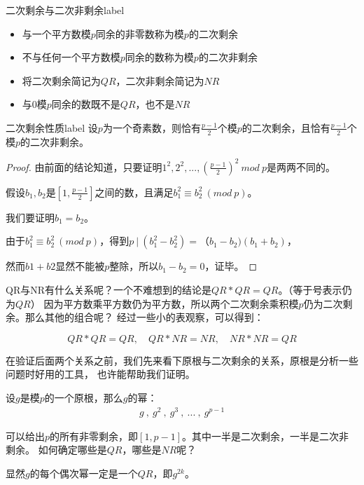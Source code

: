 \begin{definition}{二次剩余与二次非剩余}{label}
\begin{itemize}
\item 与一个平方数模$p$同余的非零数称为模$p$的二次剩余
\item 不与任何一个平方数模$p$同余的数称为模$p$的二次非剩余
\item 将二次剩余简记为$QR$，二次非剩余简记为$NR$
\item 与0模$p$同余的数既不是$QR$，也不是$NR$
\end{itemize}
\end{definition}


\begin{theorem}{二次剩余性质}{label}
设$p$为一个奇素数，则恰有$\frac{p-1}{2}$个模$p$的二次剩余，且恰有$\frac{p-1}{2}$个模$p$的二次非剩余。
\end{theorem}

\begin{proof}
由前面的结论知道，只要证明$1^2,2^2,...,(\frac{p-1}{2})^2  \ mod \ p$是两两不同的。

假设$b_1,b_2$是$[1,\frac{p-1}{2}]$之间的数，且满足$b_1^2\equiv b_2^2\ (mod \ p)$。

我们要证明$b_1=b_2$。

由于$b_1^2\equiv b_2^2\ (mod \ p)$，得到$p\ | \ (b_1^2-b_2^2)=（b_1-b_2)(b_1+b_2)$，

然而$b1+b2$显然不能被$p$整除，所以$b_1-b_2=0$，证毕。
\end{proof}

\vbox{}

QR与NR有什么关系呢？一个不难想到的结论是$QR*QR=QR$。（等于号表示仍为$QR$）
因为平方数乘平方数仍为平方数，所以两个二次剩余乘积模$p$仍为二次剩余。那么其他的组合呢？
经过一些小的表观察，可以得到：

$$
QR*QR=QR  ,\quad QR*NR=NR  ,\quad NR*NR=QR
$$

在验证后面两个关系之前，我们先来看下原根与二次剩余的关系，原根是分析一些问题时好用的工具，
也许能帮助我们证明。

设$g$是模$p$的一个原根，那么$g$的幂：
\begin{align}
g\ ,\ g^2\ ,\ g^3\ ,\ ...\ ,\ g^{p-1} \label{formula:primeroot-residue}
\end{align}

可以给出$p$的所有非零剩余，即$[1,p-1]$。其中一半是二次剩余，一半是二次非剩余。
如何确定哪些是$QR$，哪些是$NR$呢？

显然$g$的每个偶次幂一定是一个$QR$，即$g^{2k}$。

